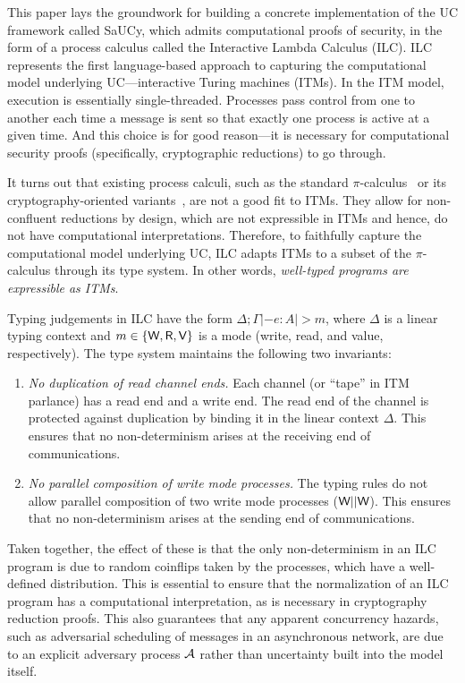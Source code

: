 This paper lays the groundwork for building a concrete implementation of the UC
framework called SaUCy, which admits computational proofs of security, in the
form of a process calculus called the Interactive Lambda Calculus (ILC). ILC
represents the first language-based approach to capturing the computational
model underlying UC---interactive Turing machines (ITMs). In the ITM model,
execution is essentially single-threaded. Processes pass control from one to
another each time a message is sent so that exactly one process is active at a
given time. And this choice is for good reason---it is necessary for computational
security proofs (specifically, cryptographic reductions) to go through.

It turns out that existing process calculi, such as the standard
$\pi$-calculus~\cite{milner1999communicating} or its cryptography-oriented
variants~\cite{abadi1999calculus, abadi2001mobile}, are not a good fit to
ITMs. They allow for non-confluent reductions by design, which are not
expressible in ITMs and hence, do not have computational interpretations.
Therefore, to faithfully capture the computational model underlying UC, ILC
adapts ITMs to a subset of the $\pi$-calculus through its type system. In other
words, \emph{well-typed programs are expressible as ITMs}.

Typing judgements in ILC have the form $\Delta ; \Gamma |- e : A |> m$, where $\Delta$ is a
linear typing context and $m \in \{\textsf{W}, \textsf{R}, \textsf{V}\}$ is a mode (write, read, and
value, respectively). The type system maintains the following two invariants:

\begin{enumerate}[leftmargin=*]
\item \emph{No duplication of read channel ends.} Each channel (or ``tape'' in
  ITM parlance) has a read end and a write end. The read end of the channel is
  protected against duplication by binding it in the linear context $\Delta$. This
  ensures that no non-determinism arises at the receiving end of communications.

\item \emph{No parallel composition of write mode processes.} The typing rules
  do not allow parallel composition of two write mode processes ($\textsf{W} ||
  \textsf{W}$). This ensures that no non-determinism arises at the sending end of
  communications.
\end{enumerate}

Taken together, the effect of these is that the only non-determinism in an ILC
program is due to random coinflips taken by the processes, which have a
well-defined distribution. This is essential to ensure that the normalization of
an ILC program has a computational interpretation, as is necessary in
cryptography reduction proofs. This also guarantees that any apparent
concurrency hazards, such as adversarial scheduling of messages in an
asynchronous network, are due to an explicit adversary process $\mathcal{{A}}$ rather
than uncertainty built into the model itself.

